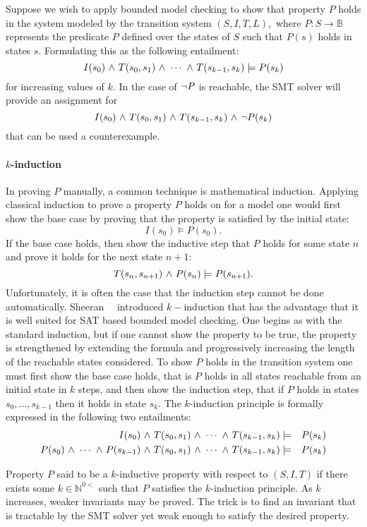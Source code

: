   
Suppose we wish to apply bounded model checking to show that property
$P$ holds in  the system modeled by the transition
system $(S,I,T,L),$ where $P: S \rightarrow \mathbb{B}$ represents
the predicate $P$ defined over the states of $S$ such that $P(s)$
holds in states $s.$
Formulating this as the following entailment:
$$ I(s_0) {\ \wedge \ } T(s_0,s_1) {\ \wedge \ } \cdots {\ \wedge \ } T(s_{k-1},s_k)
\models P(s_k)$$
for increasing values of $k.$ In the case of ${\neg} P$ is reachable,
the SMT solver will provide an assignment for 
$$I(s_0) {\ \wedge \ } T(s_0,s_1) {\ \wedge \ } T(s_{k-1},s_k) {\ \wedge \ } {\neg}
P(s_k)$$
that can be used a counterexample. 

\paragraph{$k$-induction}  In proving $P$ manually, a common technique
is mathematical induction.  Applying classical induction to prove a
property $P$ holds on  for a model one would first show the base case
by proving that the property is satisfied by the initial state:
$$I(s_0) \models P(s_0).$$
If the base case holds, then show the inductive step that $P$ holds
for some state $n$ and prove it holds for the next state $n+1:$
$$ T(s_{n},s_{n+1}) {\ \wedge \ } P(s_n) \models P(s_{n+1}).$$
Unfortunately, it is often the case that the induction step cannot be
done automatically.  Sheeran~\etal~\cite{Sheeran00, EenS03} introduced
$k-$induction that has the advantage that it is well suited for SAT
based bounded model checking.  One begins as with the standard
induction, but if one cannot show the property to be true, the
property is strengthened by extending the formula and
progressively increasing the length of the reachable states
considered.  To show $P$ holds in the transition system one must first
show the base case holds, that is $P$ holds in all states reachable
from an initial state in $k$ steps, and then show the induction step,
that if $P$ holds in states $s_0,\ldots,s_{k-1}$ then it holds in
state $s_k.$ The $k$-induction principle is formally expressed in the
following two entailments:
\begin{eqnarray*}
I(s_0) {\ \wedge \ } T(s_0,s_1) {\ \wedge \ } \cdots {\ \wedge \ } T(s_{k-1},s_k) &\models&
P(s_k) \\
P(s_0) {\ \wedge \ } \cdots {\ \wedge \ } P(s_{k-1}) {\ \wedge \ } T(s_0,s_1) {\ \wedge \ } \cdots {\ \wedge \ } T(s_{k-1},s_k) &\models&
P(s_k) 
\end{eqnarray*} 

Property $P$ said to be a $k$-inductive property with respect to
$(S,I,T)$ if there exists some $k \in \mathbb{N}^{0<}$ such that $P$
satisfies the $k$-induction principle. As $k$ increases, weaker
invariants may be proved. The trick is to find an invariant that is
tractable by the SMT solver yet weak enough to satisfy the desired
property.  

